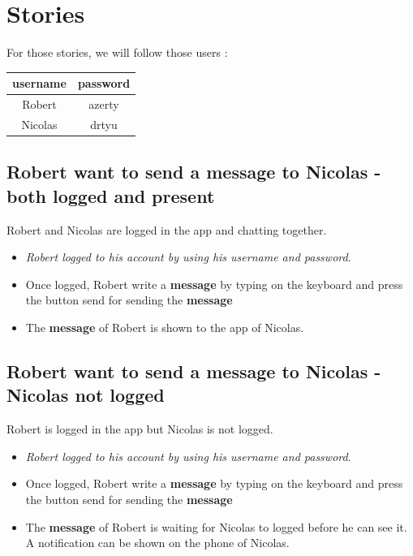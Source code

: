 \documentclass[11pt]{article}
\begin{document}
\section{Stories}

For those stories, we will follow those users :

\begin{table}[!hbt]
	\centering
	\begin{tabular}{|c|c|}
		\hline
		username & password \\  [0.5ex]
		\hline 
		 Robert & azerty \\  
		\hline 
		 Nicolas & drtyu \\  
		\hline 
	\end{tabular} 
	\label{table:nonlin}
\end{table}

\subsection{Robert want to send a \textbf{message} to Nicolas - both logged and present}

Robert and Nicolas are logged in the app and chatting together.

\begin{itemize}
  \item \emph{Robert logged to his account by using his username and password}.
  \item Once logged, Robert write a \textbf{message} by typing on the keyboard and press the button send for sending the \textbf{message}
  \item The \textbf{message} of Robert is shown to the app of Nicolas.
\end{itemize}

\subsection{Robert want to send a \textbf{message} to Nicolas - Nicolas not logged}

Robert is logged in the app but Nicolas is not logged.

\begin{itemize}
  \item \emph{Robert logged to his account by using his username and password}.
  \item Once logged, Robert write a \textbf{message} by typing on the keyboard and press the button send for sending the \textbf{message}
  \item The \textbf{message} of Robert is waiting for Nicolas to logged before he can see it. \color{blue}A notification can be shown on the phone of Nicolas.
\end{itemize}
\end{document}
